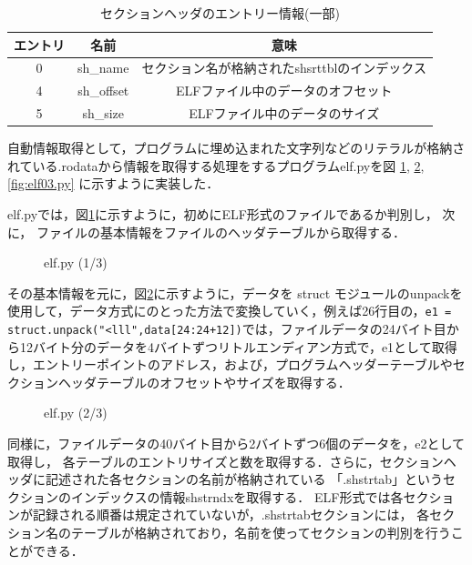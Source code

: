 \documentclass[dvipdfmx]{bta}
\begin{document}
\begin{table}[htbp]
	\centering
	\caption{セクションヘッダのエントリー情報(一部)}\label{tbl:sehd}
	\begin{tabular}{c|c|c}\hline
		エントリ & 名前 & 意味 \\\hline
		0 & sh\_name & セクション名が格納されたshsrttblのインデックス \\
		4 & sh\_offset & ELFファイル中のデータのオフセット \\
		5 & sh\_size & ELFファイル中のデータのサイズ \\\hline
	\end{tabular}
\end{table}	

自動情報取得として，プログラムに埋め込まれた文字列などのリテラルが格納されている.rodataから情報を取得する処理をするプログラムelf.pyを図
\ref{fig:elf01.py},
\ref{fig:elf02.py},
\ref{fig:elf03.py}
に示すように実装した．

elf.pyでは，図\ref{fig:elf01.py}に示すように，初めにELF形式のファイルであるか判別し，
次に，%
ファイルの基本情報をファイルのヘッダテーブルから取得する．

\begin{figure}[htbp]
	
	\caption{elf.py (1/3)}\label{fig:elf01.py}
\end{figure}


その基本情報を元に，図\ref{fig:elf02.py}に示すように，データを struct モジュールのunpackを使用して，データ方式にのとった方法で変換していく，例えば26行目の，\verb!e1 = struct.unpack("<lll",data[24:24+12])!では，ファイルデータの24バイト目から12バイト分のデータを4バイトずつリトルエンディアン方式で，e1として取得し，エントリーポイントのアドレス，および，プログラムヘッダーテーブルやセクションヘッダテーブルのオフセットやサイズを取得する．

\begin{figure}[htbp]
	
	\caption{elf.py (2/3)}\label{fig:elf02.py}
\end{figure}

同様に，ファイルデータの40バイト目から2バイトずつ6個のデータを，e2として取得し，
各テーブルのエントリサイズと数を取得する．さらに，セクションヘッダに記述された各セクションの名前が格納されている 「.shstrtab」というセクションのインデックスの情報shstrndxを取得する．
ELF形式では各セクションが記録される順番は規定されていないが，.shstrtabセクションには，
各セクション名のテーブルが格納されており，名前を使ってセクションの判別を行うことができる．
\end{document}
